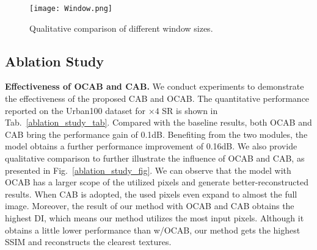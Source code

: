 \documentclass[10pt,twocolumn,letterpaper]{article}
\begin{document}
\begin{table}[!t]
\center
\begin{center}
\caption{Quantitative comparison on PSNR(dB) of different window sizes.}
\vspace{-0.2cm}
\label{win_size_cmp_lab}
\end{center}
\vspace{-0.2cm}
\end{table}

\begin{figure}[!t]
\centering
\texttt{[image: Window.png]}
\vspace{-0.3cm}
\caption{Qualitative comparison of different window sizes.}
\vspace{-0.5cm}
\label{win_size_cmp_fig}
\end{figure}

\subsection{Ablation Study}
\noindent
\textbf{Effectiveness of OCAB and CAB.}
We conduct experiments to demonstrate the effectiveness of the proposed CAB and OCAB. The quantitative performance reported on the Urban100 dataset for $\times4$ SR is shown in Tab.~\ref{ablation_study_tab}. 
Compared with the baseline results, both OCAB and CAB bring the performance gain of 0.1dB. Benefiting from the two modules, the model obtains a further performance improvement of 0.16dB. We also provide qualitative comparison to further illustrate the influence of OCAB and CAB, as presented in Fig.~\ref{ablation_study_fig}. We can observe that the model with OCAB has a larger scope of the utilized pixels and generate better-reconstructed results. When CAB is adopted, the used pixels even expand to almost the full image. Moreover, the result of our method with OCAB and CAB obtains the highest DI\cite{lam}, which means our method utilizes the most input pixels. Although it obtains a little lower performance than w/OCAB, our method gets the highest SSIM and reconstructs the clearest textures.
\end{document}
